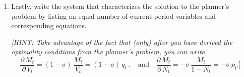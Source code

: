 \documentclass[dvipsnames,11pt]{article}
\begin{document}
\begin{enumerate}
                \begin{solution}
First, notice that:
\begin{align*}
    p_t=\frac{M_t}{1-N_t}=\frac{V_t^{1-\sigma}(1-N_t)^\sigma}{1-N_t}=V_t^{1-\sigma}(1-N_t)^{\sigma-1}.
\end{align*}
The envelope condition is:
\begin{align*}
    \frac{\partial U(z_t,N_t)}{\partial N_t}=-b+\mu_t z_t+\psi_t(1-\lambda)-\sigma\psi_tV_t^{1-\sigma}(1-N_t)^{\sigma-1}. 
\end{align*}
Now, we can write the following:
\begin{align*}
    \widetilde{U}_N(z_t,N_t) & = \frac{1}{u'(C_t)} \frac{\partial U(z_t,N_t)}{\partial N_t} \\
    &= \frac{1}{u'(C_t)} (-b+\mu_tz_t+(1-\lambda)\psi_t-\sigma\psi_tV_t^{1-\sigma}(1-N_t)^{\sigma-1} ) \\
    &= \frac{1}{u'(C_t)} \left[ -b+z_tu'(C_t)+(1-\lambda-\sigma p_t)\frac{\kappa}{q_t}\frac{u'(C_t)}{1-\sigma} \right] \\
    &= z_t-\frac{b}{u'(C_t)}+\frac{1-\lambda-\sigma p_t}{1-\sigma}\beta (1-\sigma) \mathbb{E}_t \left[ \frac{u'(C_{t+1})}{u'(C_t)} \widetilde{U}_N(z_{t+1},N_{t+1}) \right] \\
    &= z_t-\frac{b}{u'(C_t)}+\beta(1-\lambda-\sigma p_t) \mathbb{E}_t \left[ \frac{u'(C_{t+1})}{u'(C_t)} \widetilde{U}_N(z_{t+1},N_{t+1}) \right]
\end{align*}

                    
                    
                \end{solution}

            \item Lastly, write the system that characterizes the solution to the planner's problem by listing an equal number of current-period variables and corresponding equations.

            \textit{[HINT: Take advantage of the fact that (only) after you have derived the optimality conditions from the planner's problem, you can write
            $$ \frac{\partial\,M_t}{\partial\,V_t} = (1-\sigma)\,\frac{M_t}{V_t} = (1-\sigma)\,q_t\,,\quad\text{and}\quad \frac{\partial\,M_t}{\partial\,N_t} = -\sigma\,\frac{M_t}{1 - N_t} = - \sigma\,p_t.]$$}


\end{enumerate}
\end{document}
